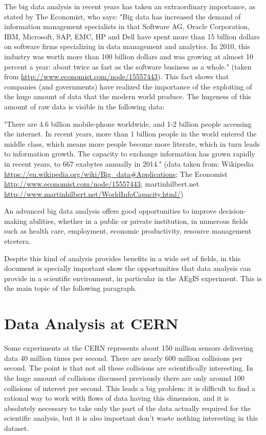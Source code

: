 The big data analysis in recent years has taken an extraordinary importance, as stated by The Economist, who says:
"Big data has increased the demand of information management specialists in that Software AG, Oracle Corporation, IBM, Microsoft, SAP, EMC, HP and Dell have spent more than 15 billion dollars on software firms specializing in data management and analytics. In 2010, this industry was worth more than 100 billion dollars and was growing at almost 10 percent a year: about twice as fast as the software business as a whole."
(taken from \url{http://www.economist.com/node/15557443}).
This fact shows that companies (and governments) have realized the importance of the exploiting of the huge amount of data that the modern world produce. The hugeness of this amount of raw data is visible in the following data:

"There are 4.6 billion mobile-phone worldwide, and 1-2 billion people accessing the internet. In recent years, more than 1 billion people in the world entered the middle class, which means more people become more literate, which in turn leads to information growth. The capacity to exchange information has grown rapidly in recent years, to 667 exabytes annually in 2014." 
(data taken from: Wikipedia \url{https://en.wikipedia.org/wiki/Big_data#Applications}; The Economist \url{http://www.economist.com/node/15557443}; martinhilbert.net  \url{http://www.martinhilbert.net/WorldInfoCapacity.html/})

An advanced big data analysis offers good opportunities to improve decision-making abilities, whether in a public or private institution, in numerous fields such as health care, employment, economic productivity, resource management etcetera. 

Despite this kind of analysis provides benefits in a wide set of fields, in this document is specially important show the opportunities that data analysis can provide in a scientific environment, in particular in the AEgIS experiment. This is the main topic of the following paragraph.

\section{Data Analysis at CERN}

Some experiments at the CERN represents about 150 million sensors delivering data 40 million times per second. There are nearly 600 million collisions per second. The point is that not all these collisions are scientifically interesting. In the huge amount of collisions discussed previously there are only around 100 collisions of interest per second.
This leads a big problem: it is difficult to find a rational way to work with flows of data having this dimension, and it is absolutely necessary to take only the part of the data actually required for the scientific analysis, but it is also important don't waste nothing interesting in this dataset.

